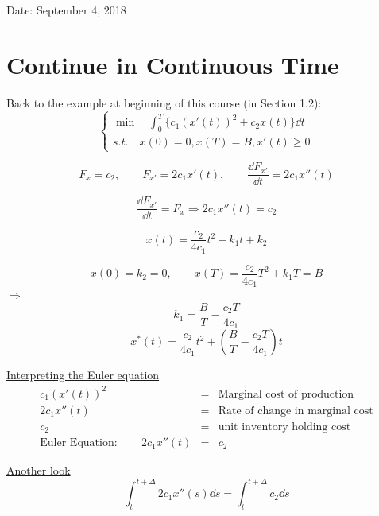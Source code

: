 \documentclass[twoside]{article}
\newcommand\imp{$\Longrightarrow$}
\begin{document}

\hfill Date: September 4, 2018

\section{Continue in Continuous Time}
Back to the example at beginning of this course (in Section 1.2):
\begin{equation}
    \begin{cases}
        \min \quad \int_0^T \{c_1 (x'(t))^2 + c_2 x(t)\}\dd t\\[0.5em]
        s.t. \quad x(0) = 0, x(T) =  B, x'(t)\geq 0
    \end{cases}
\end{equation}

\[
    F_x = c_2, \qquad F_{x'} = 2 c_1 x'(t), \qquad \frac{\dd F_{x'}}{\dd t} = 2c_1 x''(t) 
\]

\[
    \frac{\dd F_{x'}}{\dd t} = F_x \Longrightarrow 2c_1 x''(t) = c_2
\]

\[
    x(t) = \frac{c_2}{4 c_1}t^2 + k_1 t + k_2 
\]

\[
    x(0) = k_2 = 0, \qquad x(T) = \frac{c_2}{4 c_1}T^2 + k_1 T = B
\]
\imp
\begin{equation}
    k_1 = \frac{B}{T} - \frac{c_2 T}{4 c_1}
\end{equation}
\begin{equation}
    x^*(t) =  \frac{c_2}{4 c_1}t^2 + (\frac{B}{T} - \frac{c_2 T}{4 c_1})t
\end{equation}

\underline{Interpreting the Euler equation}
\begin{eqnarray}
    c_1(x'(t))^2 &=& \text{Marginal cost of production}\\
    2c_1 x''(t) &=& \text{Rate of change in marginal cost}\\
    c_2 &=& \text{unit inventory holding cost}\\
    \text{Euler Equation}: \qquad 2c_1 x''(t) &=& c_2
\end{eqnarray}

\underline{Another look}
\begin{equation}
    \int_t^{t+ \Delta} 2 c_1 x''(s) \dd s = \int_t^{t+ \Delta} c_2 \dd s
\end{equation}
\end{document}
